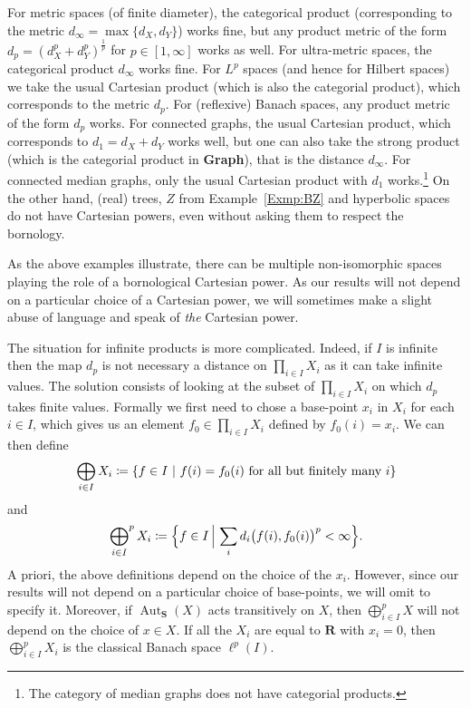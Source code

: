 \documentclass[a4paper]{article}
\newcounter{mycomment}
\newcommand{\mycomment}[2][]{\refstepcounter{mycomment}{\todo[color={green!33},size=\small]{\textbf{Commentaire [\uppercase{#1}\themycomment]:}~#2}}}
\newcommand{\GS}[1]{\mycomment[GS]{#1}}
\theoremstyle{definition}
\DeclareMathOperator\Aut{Aut}
\newcommand*{\field}[1]{\mathbf{#1}}
\newcommand*{\category}[1]{\textbf{#1}}
\newcommand*{\CatS}{\category{S}}
\newcommand*{\R}{\field{R}}
\newcommand{\setst}[2]{\{#1\ |\ #2\}}
\begin{document}
For metric spaces (of finite diameter), the categorical product (corresponding to the metric $d_\infty=\max\{d_X,d_Y\}$) works fine, but any product metric of the form $d_p=(d_X^p+d_Y^p)^{\frac1p}$ for $p\in[1,\infty]$ works as well.
For ultra-metric spaces, the categorical product $d_\infty$ works fine.
For $L^p$ spaces (and hence for Hilbert spaces) we take the usual Cartesian product (which is also the categorial product), which corresponds to the metric $d_p$.
For (reflexive) Banach spaces, any product metric of the form $d_p$ works.
For connected graphs, the usual Cartesian product, which corresponds to $d_1=d_X+d_Y$ works well, but one can also take the strong product (which is the categorial product in \category{Graph}), that is the distance $d_\infty$.
For connected median graphs, only the usual Cartesian product with $d_1$ works.\footnote{The category of median graphs does not have categorial products.}
On the other hand, (real) trees, $Z$ from Example~\ref{Exmp:BZ} and hyperbolic spaces do not have Cartesian powers, even without asking them to respect the bornology.

As the above examples illustrate, there can be multiple non-isomorphic spaces playing the role of a bornological Cartesian power. As our results will not depend on a particular choice of a Cartesian power, we will sometimes make a slight abuse of language and speak of \emph{the} Cartesian power.

The situation for infinite products is more complicated. Indeed, if $I$ is infinite then the map $d_p$ is not necessary a distance on $\prod_{i\in I}X_i$ as it can take infinite values.
The solution consists of looking at the subset of $\prod_{i\in I}X_i$ on which $d_p$ takes finite values.
Formally we first need to chose a base-point $x_i$ in $X_i$ for each $i\in I$, which gives us an element $f_0\in \prod_{i\in I}X_i$ defined by $f_0(i)=x_i$. We can then define
\begin{equation*}
\sideset{}{}\bigoplus_{i \in I}X_i \coloneqq\setst{f\in I}{f(i)=f_0(i)\textnormal{ for all but finitely many }i}
\end{equation*}
and%
\begin{equation*}
\sideset{}{^p}\bigoplus_{i \in I}X_i \coloneqq\Bigl\{f\in I\,\Big|\,\sum_i d_i\bigl(f(i),f_0(i)\bigr)^p<\infty\Bigr\}.
\end{equation*}
A priori, the above definitions depend on the choice of the $x_i$. However, since our results will not depend on a particular choice of base-points, we will omit to specify it.
Moreover, if $\Aut_\CatS(X)$ acts transitively on $X$, then $\bigoplus_{i \in I}^pX$ will not depend on the choice of $x\in X$. If all the $X_i$ are equal to $\R$ with $x_i =0$, then $\bigoplus_{i \in I}^pX_i$ is the classical Banach space $\ell^p(I)$.
\end{document}
